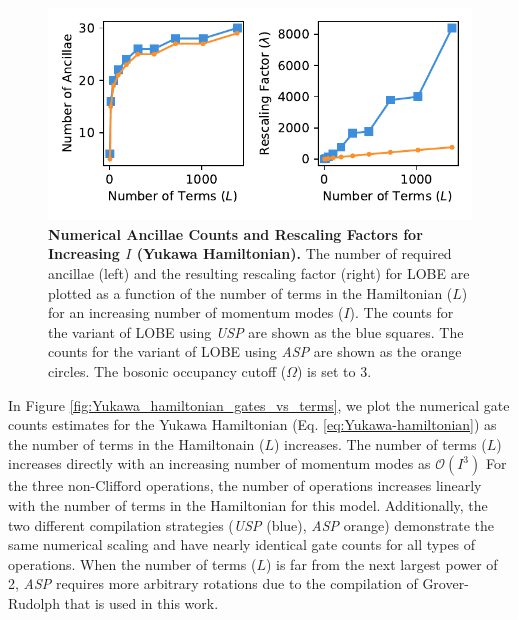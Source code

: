 \begin{figure}
    \centering
    \includegraphics[width=12cm]{figures/Yukawa_hamiltonian_qubits_and_rescaling_vs_terms.pdf}
    \caption{
        \textbf{Numerical Ancillae Counts and Rescaling Factors for Increasing $I$ (Yukawa Hamiltonian).}
        The number of required ancillae (left) and the resulting rescaling factor (right) for LOBE are plotted as a function of the number of terms in the Hamiltonian ($L$) for an increasing number of momentum modes ($I$).
        The counts for the variant of LOBE using \textit{USP} are shown as the blue squares.
        The counts for the variant of LOBE using \textit{ASP} are shown as the orange circles.
        The bosonic occupancy cutoff ($\Omega$) is set to $3$.
    }
    \label{fig:Yukawa_hamiltonian_qubits_and_rescaling_vs_terms}
\end{figure}

In Figure \ref{fig:Yukawa_hamiltonian_gates_vs_terms}, we plot the numerical gate counts estimates for the Yukawa Hamiltonian (Eq. \ref{eq:Yukawa-hamiltonian})  as the number of terms in the Hamiltonain ($L$) increases.
The number of terms ($L$) increases directly with an increasing number of momentum modes as $\mathcal{O}(I^3)$
For the three non-Clifford operations, the number of operations increases linearly with the number of terms in the Hamiltonian for this model.
Additionally, the two different compilation strategies (\textit{USP} (blue), \textit{ASP} orange) demonstrate the same numerical scaling and have nearly identical gate counts for all types of operations.
When the number of terms ($L$) is far from the next largest power of 2, \textit{ASP} requires more arbitrary rotations due to the compilation of Grover-Rudolph that is used in this work.

